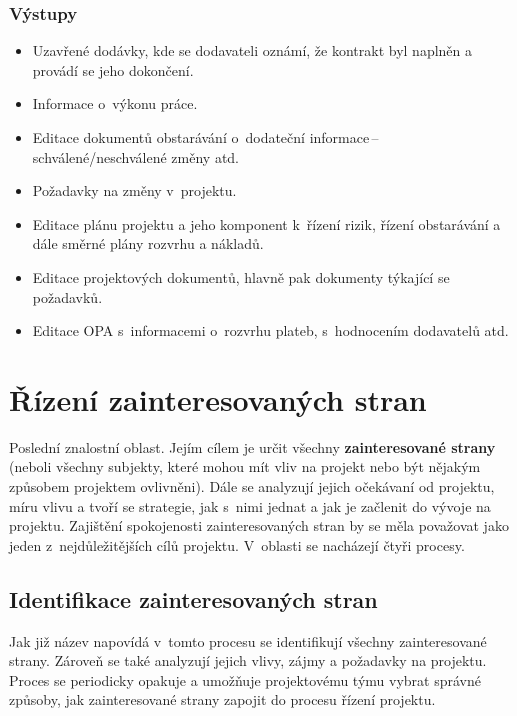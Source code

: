 \subsubsection*{Výstupy}
\begin{itemize}
    \item Uzavřené dodávky, kde se dodavateli oznámí, že kontrakt byl naplněn a provádí se jeho dokončení.
    \item Informace o~výkonu práce. 
    \item Editace dokumentů obstarávání o~dodateční informace\,--\,schválené/neschválené změny atd.
    \item Požadavky na změny v~projektu.
    \item Editace plánu projektu a jeho komponent k~řízení rizik, řízení obstarávání a dále směrné plány rozvrhu a nákladů.
    \item Editace projektových dokumentů, hlavně pak dokumenty týkající se požadavků.
    \item Editace OPA s~informacemi o~rozvrhu plateb, s~hodnocením dodavatelů atd.
\end{itemize}


\section{Řízení zainteresovaných stran}
\label{RizeniZainterStran}

Poslední znalostní oblast. Jejím cílem je určit všechny \textbf{zainteresované strany} (neboli všechny subjekty, které mohou mít vliv na projekt nebo být nějakým způsobem projektem ovlivněni). Dále se analyzují jejich očekávaní od projektu, míru vlivu a tvoří se strategie, jak s~nimi jednat a jak je začlenit do vývoje na projektu. Zajištění spokojenosti zainteresovaných stran by se měla považovat jako jeden z~nejdůležitějších cílů projektu. V~oblasti se nacházejí čtyři procesy.


\subsection*{Identifikace zainteresovaných stran}

Jak již název napovídá v~tomto procesu se identifikují všechny zainteresované strany. Zároveň se také analyzují jejich vlivy, zájmy a požadavky na projektu. Proces se periodicky opakuje a umožňuje projektovému týmu vybrat správné způsoby, jak zainteresované strany zapojit do procesu řízení projektu.


